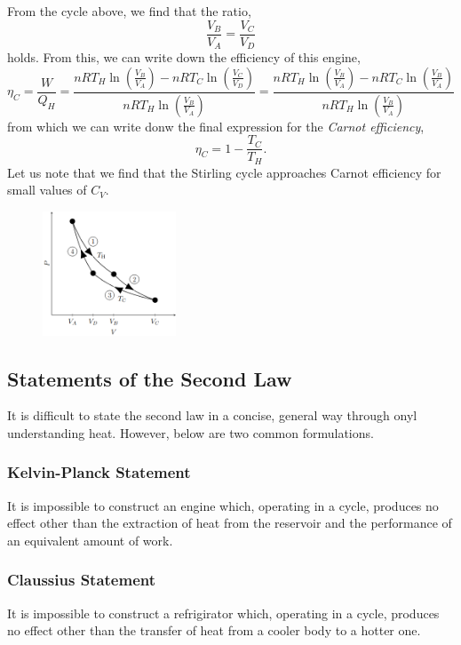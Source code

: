 \documentclass{book}
\begin{document}
From the cycle above, we find that the ratio,
\begin{equation}
	\frac{V_B}{V_A} = \frac{V_C}{V_D}
\end{equation}
holds. From this, we can write down the efficiency of this engine,
\begin{equation}
	\eta_C  = \frac{W}{Q_H} = \frac{nRT_H\ln\left(\frac{V_B}{V_A}\right) - nRT_C\ln\left(\frac{V_C}{V_D}\right)}{nRT_H\ln\left(\frac{V_B}{V_A}\right)} = \frac{nRT_H\ln\left(\frac{V_B}{V_A}\right) - nRT_C\ln\left(\frac{V_B}{V_A}\right)}{nRT_H\ln\left(\frac{V_B}{V_A}\right)}
\end{equation}
from which we can write donw the final expression for the \textit{Carnot efficiency},
\begin{equation}
	\boxed{\eta_C = 1 - \frac{T_C}{T_H}}.
\end{equation}
Let us note that we find that the Stirling cycle approaches Carnot efficiency for small values of $C_V$.
\begin{figure}
	\centering
	\includegraphics[width=150px]{carnot.png}
	\caption{} \label{fig:carnot}
\end{figure}
\subsection{Statements of the Second Law}
It is difficult to state the second law in a concise, general way through onyl understanding heat. However, below are two common formulations.

\subsubsection{Kelvin-Planck Statement}
\begin{tcolorbox}
	It is impossible to construct an engine which, operating in a cycle, produces no effect other than the extraction of heat from the reservoir and the performance of an equivalent amount of work.
\end{tcolorbox}

\subsubsection{Claussius Statement}
\begin{tcolorbox}
	It is impossible to construct a refrigirator which, operating in a cycle, produces no effect other than the transfer of heat from a cooler body to a hotter one.
\end{tcolorbox}
\end{document}
